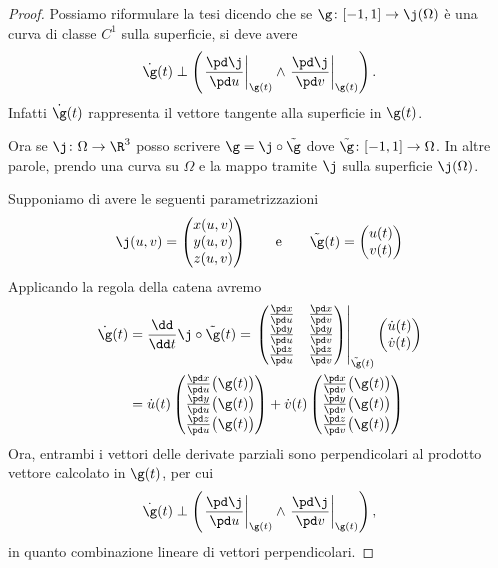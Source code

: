 \begin{proof}
	Possiamo riformulare la tesi dicendo che se \(\g\colon [-1,1] \to \j(\Omega)\) è una curva di classe \(C^1\) sulla superficie, si deve avere
	\[
		\dot{\g}(t) \perp \left( \left.\frac{\pd \j}{\pd u}\right|_{\g(t)} \wedge \left.\frac{\pd \j}{\pd v}\right|_{\g(t)} \right).
	\]
	Infatti \(\dot{\g}(t)\) rappresenta il vettore tangente alla superficie in \(\g(t)\).

	Ora se \(\j\colon \Omega \to \R^3\) posso scrivere \(\g = \j \circ \tilde{\g}\) dove \(\tilde{\g}\colon [-1,1] \to \Omega\).
	In altre parole, prendo una curva su \(\Omega\) e la mappo tramite \(\j\) sulla superficie \(\j(\Omega)\).

	Supponiamo di avere le seguenti parametrizzazioni
	\[
		\j(u,v) = 	\begin{pmatrix}
			x(u,v) \\
			y(u,v) \\
			z(u,v)
		\end{pmatrix}
		\qquad\text{e}\qquad
		\tilde{\g}(t) = \begin{pmatrix}
			u(t) \\
			v(t)
		\end{pmatrix}
	\]
	Applicando la regola della catena avremo
	\[
		\begin{split}
			\dot{\g}(t) & = \frac{\dd}{\dd t} \j \circ \tilde{\g}(t) =  \left.	\begin{pmatrix}
				\frac{\pd x}{\pd u} & \frac{\pd x}{\pd v} \\
				\frac{\pd y}{\pd u} & \frac{\pd y}{\pd v} \\
				\frac{\pd z}{\pd u} & \frac{\pd z}{\pd v}
			\end{pmatrix}\right|_{\tilde{\g}(t)}
			\begin{pmatrix}
				\dot{u}(t) \\
				\dot{v}(t)
			\end{pmatrix}\\
			& = \dot{u}(t)  \begin{pmatrix}
				\frac{\pd x}{\pd u}\big(\g(t)\big) \\
				\frac{\pd y}{\pd u}\big(\g(t)\big) \\
				\frac{\pd z}{\pd u}\big(\g(t)\big)
			\end{pmatrix}
			+ \dot{v}(t)	\begin{pmatrix}
				\frac{\pd x}{\pd v}\big(\g(t)\big) \\
				\frac{\pd y}{\pd v}\big(\g(t)\big) \\
				\frac{\pd z}{\pd v}\big(\g(t)\big)
			\end{pmatrix}
		\end{split}
	\]
	Ora, entrambi i vettori delle derivate parziali sono perpendicolari al prodotto vettore calcolato in \(\g(t)\), per cui
	\[
		\dot{\g}(t) \perp \left( \left.\frac{\pd \j}{\pd u}\right|_{\g(t)} \wedge \left.\frac{\pd \j}{\pd v}\right|_{\g(t)} \right),
	\]
	in quanto combinazione lineare di vettori perpendicolari.
\end{proof}


